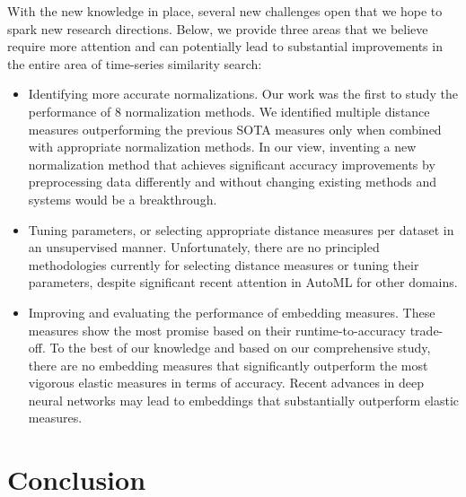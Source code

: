 \documentclass[11pt]{article}
\begin{document}
With the new knowledge in place, several new challenges open that we hope to spark new research directions. Below, we provide three areas that we believe require more attention and can potentially lead to substantial improvements in the entire area of time-series similarity search:

\begin{itemize}[noitemsep,topsep=0pt,parsep=0pt,partopsep=0pt,leftmargin=0.5cm]
	\item Identifying more accurate normalizations. Our work was the first to study the performance of $8$ normalization methods. We identified multiple distance measures outperforming the previous SOTA measures only when combined with appropriate normalization methods. In our view, inventing a new normalization method that achieves significant accuracy improvements by preprocessing data differently and without changing existing methods and systems would be a breakthrough.
    \item Tuning parameters, or selecting appropriate distance measures per dataset in an unsupervised manner. Unfortunately, there are no principled methodologies currently for selecting distance measures or tuning their parameters, despite significant recent attention in AutoML for other domains.
    \item Improving and evaluating the performance of embedding measures. These measures show the most promise based on their runtime-to-accuracy trade-off. To the best of our knowledge and based on our comprehensive study, there are no embedding measures that significantly outperform the most vigorous elastic measures in terms of accuracy. Recent advances in deep neural networks \cite{wang2023seanet} may lead to embeddings that substantially outperform elastic measures. 
\end{itemize}

\section{Conclusion}
\label{john_sec:conclusions}
\end{document}
